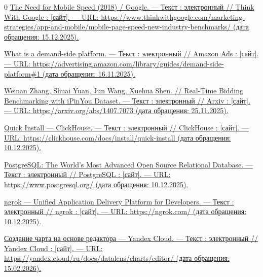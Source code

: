\begin{thebibliography}{0}
\hypertarget{need-web-speed}{}
\href{https://www.thinkwithgoogle.com/marketing-strategies/app-and-mobile/mobile-page-speed-new-industry-benchmarks/}{
The Need for Mobile Speed (2018) / Google. — Текст : электронный // Think With Google : [сайт]. — URL: https://www.thinkwithgoogle.com/marketing-strategies/app-and-mobile/mobile-page-speed-new-industry-benchmarks/ (дата обращения: 15.12.2025).}

\hypertarget{dsp}{}
\href{https://advertising.amazon.com/library/guides/demand-side-platform#1}{
What is a demand-side platform. — Текст : электронный // Amazon Ads : [сайт]. — URL: https://advertising.amazon.com/library/guides/demand-side-platform\#1 (дата обращения: 16.11.2025).}

    
\hypertarget{rtb-benchmarking}{}
\href{https://arxiv.org/abs/1407.7073}{
Weinan Zhang, Shuai Yuan, Jun Wang, Xuehua Shen. // Real-Time Bidding Benchmarking with iPinYou Dataset. — Текст : электронный // Arxiv : [сайт]. — URL: https://arxiv.org/abs/1407.7073 (дата обращения: 25.11.2025).}
    
\hypertarget{clickhouse-install}{}
\href{https://clickhouse.com/docs/install/quick-install}{Quick Install — ClickHouse. — Текст : электронный // ClickHouse : [сайт]. — URL: https://clickhouse.com/docs/install/quick-install (дата обращения: 10.12.2025).}

\hypertarget{postgresql}{}
\href{https://www.postgresql.org/}{PostgreSQL: The World's Most Advanced Open Source Relational Database. — Текст : электронный // PostgreSQL : [сайт]. — URL: https://www.postgresql.org/ (дата обращения: 10.12.2025).}

\hypertarget{ngrok}{}
\href{https://ngrok.com/}{ngrok — Unified Application Delivery Platform for Developers. — Текст : электронный // ngrok : [сайт]. — URL: https://ngrok.com/ (дата обращения: 10.12.2025).}

\hypertarget{datalens-advanced-charts}{}
\href{https://yandex.cloud/ru/docs/datalens/charts/editor/}{Создание чарта на основе редактора — Yandex Cloud. — Текст : электронный // Yandex Cloud : [сайт]. — URL: https://yandex.cloud/ru/docs/datalens/charts/editor/ (дата обращения: 15.02.2026).}

\end{thebibliography}